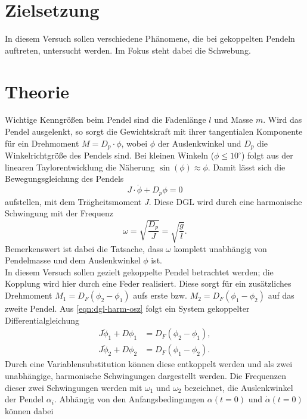 \section*{Zielsetzung}
\label{sec:Zielsetzung}
In diesem Versuch sollen verschiedene Phänomene, die bei gekoppelten Pendeln auftreten,
untersucht werden. Im Fokus steht dabei die Schwebung.

\section{Theorie}
\label{sec:Theorie}
Wichtige Kenngrößen beim Pendel sind die Fadenlänge $l$ und Masse $m$. Wird das Pendel
ausgelenkt, so sorgt die Gewichtskraft mit ihrer tangentialen Komponente für ein
Drehmoment $M = D_p \cdot \phi$, wobei $\phi$ der Auslenkwinkel und $D_p$ die
Winkelrichtgröße des Pendels sind. Bei kleinen Winkeln ($\phi \leq 10^\circ$) 
folgt aus der linearen Taylorentwicklung die Näherung $\sin(\phi) \approx \phi$.
Damit lässt sich die Bewegungsgleichung des Pendels
\begin{equation}
	J \cdot \ddot \phi + D_p \phi = 0
	\label{eqn:dgl-harm-osz}
\end{equation}
aufstellen, mit dem Trägheitsmoment $J$. Diese DGL wird durch eine harmonische Schwingung
mit der Frequenz
\begin{equation}
	\omega = \sqrt{\frac{D_p}{J}} = \sqrt{\frac{g}{l}}.
\end{equation}
Bemerkenswert ist dabei die Tatsache, dass $\omega$ komplett unabhängig von Pendelmasse
und dem Auslenkwinkel $\phi$ ist.
\\
In diesem Versuch sollen gezielt gekoppelte Pendel betrachtet werden; die Kopplung wird hier durch
eine Feder realisiert. Diese sorgt für ein zusätzliches Drehmoment 
$M_1 = D_F (\phi_2 - \phi_1)$ aufs erste bzw. $M_2 = D_F (\phi_1 - \phi_2)$ auf das zweite
Pendel. Aus \autoref{eqn:dgl-harm-osz} folgt ein System gekoppelter Differentialgleichung 
\begin{align}
	J \ddot \phi_1 + D \phi_1 &= D_F (\phi_2 - \phi_1), \\
	J \ddot \phi_2 + D \phi_2 &= D_F (\phi_1 - \phi_2).
\end{align}
Durch eine Variablensubstitution können diese entkoppelt werden und als zwei unabhängige,
harmonische Schwingungen dargestellt werden. Die Frequenzen dieser zwei Schwingungen
werden mit $\omega_1$ und $\omega_2$ bezeichnet, die Auslenkwinkel der Pendel $\alpha_i$.
Abhängig von den Anfangsbedingungen $\alpha(t = 0)$ und $\dot \alpha(t = 0)$ können dabei
